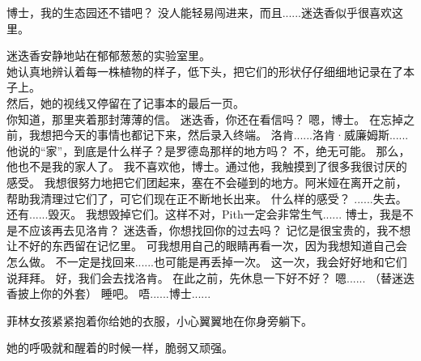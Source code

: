 \documentclass[openany]{book}
\begin{document}
\begin{dialogue}
     博士，我的生态园还不错吧？
     没人能轻易闯进来，而且......迷迭香似乎很喜欢这里。\par
    迷迭香安静地站在郁郁葱葱的实验室里。\\
    她认真地辨认着每一株植物的样子，低下头，把它们的形状仔仔细细地记录在了本子上。\\
    然后，她的视线又停留在了记事本的最后一页。\\
    你知道，那里夹着那封薄薄的信。
     迷迭香，你还在看信吗？
     嗯，博士。
     在忘掉之前，我想把今天的事情也都记下来，然后录入终端。
     洛肯......洛肯·威廉姆斯......
     他说的“家”，到底是什么样子？是罗德岛那样的地方吗？
     不，绝无可能。
     那么，他也不是我的家人了。
     我不喜欢他，博士。通过他，我触摸到了很多我很讨厌的感受。
     我想很努力地把它们团起来，塞在不会碰到的地方。阿米娅在离开之前，帮助我清理过它们了，可它们现在正不断地长出来。
     什么样的感受？
     ......失去。
     还有......毁灭。
     我想毁掉它们。这样不对，Pith一定会非常生气......
     博士，我是不是不应该再去见洛肯？
     迷迭香，你想找回你的过去吗？
     记忆是很宝贵的，我不想让不好的东西留在记忆里。
     可我想用自己的眼睛再看一次，因为我想知道自己会怎么做。
     不一定是找回来......也可能是再丢掉一次。
     这一次，我会好好地和它们说拜拜。
     好，我们会去找洛肯。
     在此之前，先休息一下好不好？
     嗯......
     （替迷迭香披上你的外套）
     睡吧。
     唔......博士......
\end{dialogue}\par

菲林女孩紧紧抱着你给她的衣服，小心翼翼地在你身旁躺下。\par
她的呼吸就和醒着的时候一样，脆弱又顽强。\par
\end{document}
